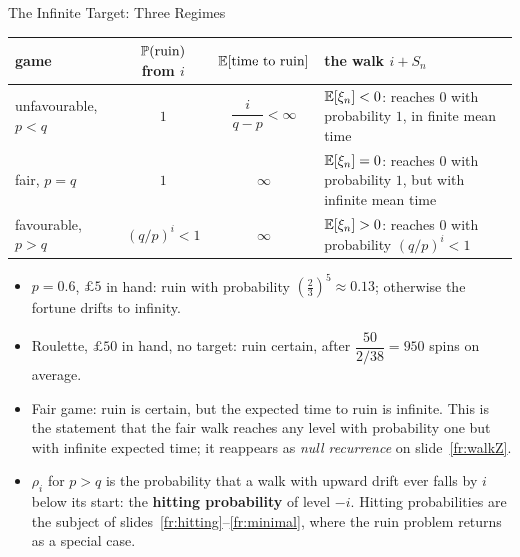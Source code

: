 \begin{frame}{The Infinite Target: Three Regimes}
  \label{fr:regimes}
  \small
  \begin{center}
    \footnotesize
    \renewcommand{\arraystretch}{1.15}
    \begin{tabular}{@{}lcc>{\raggedright\arraybackslash}p{5.8cm}@{}}
      \toprule
      game & $\mathbb{P}(\text{ruin})$ from $i$ & $\mathbb{E}[\text{time to ruin}]$ & the walk $i+S_n$ \\
      \midrule
      unfavourable, $p<q$ & $1$ & $\dfrac{i}{q-p}<\infty$ & $\mathbb{E}[\xi_n]<0$: reaches $0$ with probability $1$, in finite mean time \\
      fair, $p=q$ & $1$ & $\infty$ & $\mathbb{E}[\xi_n]=0$: reaches $0$ with probability $1$, but with infinite mean time \\
      favourable, $p>q$ & $(q/p)^i<1$ & $\infty$ & $\mathbb{E}[\xi_n]>0$: reaches $0$ with probability $(q/p)^i<1$ \\
      \bottomrule
    \end{tabular}
  \end{center}
  \begin{itemize}
    \item $p=0.6$, $\pounds5$ in hand: ruin with probability $(\tfrac23)^5\approx0.13$; otherwise the fortune drifts to infinity.
    \item Roulette, $\pounds50$ in hand, no target: ruin certain, after $\dfrac{50}{2/38}=950$ spins on average.
    \item Fair game: ruin is certain, but the expected time to ruin is infinite. This is the statement that the fair walk reaches any level with probability one but with infinite expected time; it reappears as \emph{null recurrence} on slide~\ref{fr:walkZ}.
    \item $\rho_i$ for $p>q$ is the probability that a walk with upward drift ever falls by $i$ below its start: the \textbf{hitting probability} of level $-i$. Hitting probabilities are the subject of slides~\ref{fr:hitting}--\ref{fr:minimal}, where the ruin problem returns as a special case.
  \end{itemize}
\end{frame}

